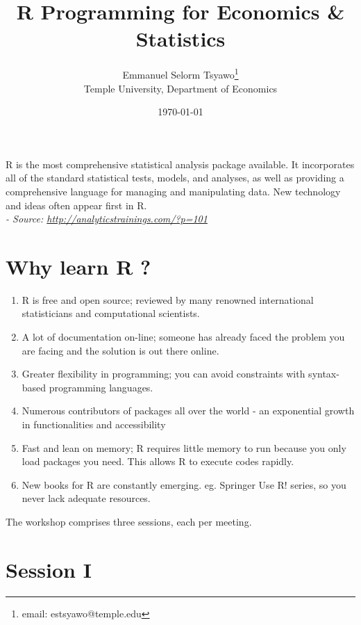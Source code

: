 \documentclass[12pt,a4paper]{article}
\begin{document}
	\title{R Programming for Economics \& Statistics}
	\author{Emmanuel Selorm Tsyawo\footnote{email: estsyawo@temple.edu} \\ \scriptsize Temple University, Department of Economics}
	\date{\today}
	\maketitle

	R is the most comprehensive statistical analysis package available. It incorporates all of the standard statistical tests, models, and analyses, as well as providing a comprehensive language for managing and manipulating data. New technology and ideas often appear first in R. \\
\textit{- Source: \url{http://analyticstrainings.com/?p=101}} 
	\section*{Why learn R ?}

	\begin{enumerate}[label=(\alph*)]
		\item R is free and open source; reviewed by many renowned international statisticians and computational scientists.
		
		\item A lot of documentation on-line; someone has already faced the problem you are facing and the solution is out there online.
		
		\item Greater flexibility in programming; you can avoid constraints with syntax-based programming languages.
		
		\item Numerous contributors of packages all over the world - an exponential growth in functionalities and accessibility
		
		\item Fast and lean on memory; R requires little memory to run because you only load packages you need. This allows R to execute codes rapidly.
		
		\item New books for R are constantly emerging. eg. Springer Use R! series, so you never lack adequate resources. 
		
	\end{enumerate}
The workshop comprises three sessions, each per meeting.

	\section{Session I}
\end{document}
